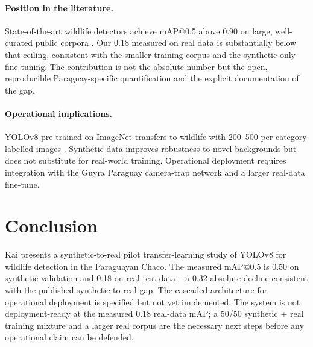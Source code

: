 \paragraph{Position in the literature.} State-of-the-art wildlife
detectors achieve mAP@0.5 above 0.90 on large, well-curated public
corpora \citep{beery2018,chen2020}. Our 0.18 measured on real data is
substantially below that ceiling, consistent with the smaller training
corpus and the synthetic-only fine-tuning. The contribution is not
the absolute number but the open, reproducible Paraguay-specific
quantification and the explicit documentation of the gap.

\paragraph{Operational implications.} YOLOv8 pre-trained on ImageNet
transfers to wildlife with 200--500 per-category labelled images
\citep{beery2018}. Synthetic data improves robustness to novel
backgrounds but does not substitute for real-world training. Operational
deployment requires integration with the Guyra Paraguay camera-trap
network and a larger real-data fine-tune.

\section{Conclusion}
\label{sec:kai-conclusion}

Kai presents a synthetic-to-real pilot transfer-learning study of
YOLOv8 for wildlife detection in the Paraguayan Chaco. The measured
mAP@0.5 is 0.50 on synthetic validation and 0.18 on real test data --
a 0.32 absolute decline consistent with the published synthetic-to-real
gap. The cascaded architecture for operational deployment is specified
but not yet implemented. The system is not deployment-ready at the
measured 0.18 real-data mAP; a 50/50 synthetic + real training
mixture and a larger real corpus are the necessary next steps before
any operational claim can be defended.